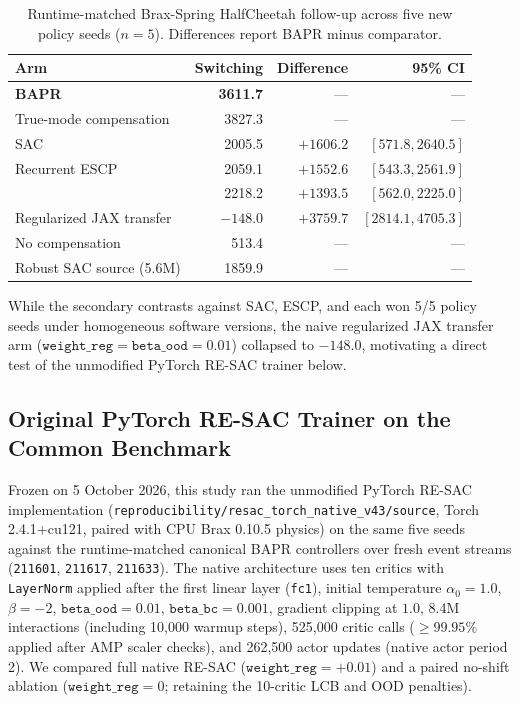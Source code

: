 \begin{table}[ht]
\centering
\caption{Runtime-matched Brax-Spring HalfCheetah follow-up across five new policy seeds ($n=5$). Differences report BAPR minus comparator.}
\label{tab:runtime_comparison}
\small
\begin{tabular}{lrrr}
\toprule
Arm & Switching & Difference & 95\% CI \\
\midrule
\textbf{BAPR} & \textbf{3611.7} & --- & --- \\
True-mode compensation & 3827.3 & --- & --- \\
SAC & 2005.5 & $+1606.2$ & $[571.8,2640.5]$ \\
Recurrent ESCP & 2059.1 & $+1552.6$ & $[543.3,2561.9]$ \\
\resacbaseline{} & 2218.2 & $+1393.5$ & $[562.0,2225.0]$ \\
Regularized JAX transfer & $-148.0$ & $+3759.7$ & $[2814.1,4705.3]$ \\
No compensation & 513.4 & --- & --- \\
Robust SAC source (5.6M) & 1859.9 & --- & --- \\
\bottomrule
\end{tabular}
\end{table}

While the secondary contrasts against SAC, ESCP, and \resacbaseline{} each won 5/5 policy seeds under homogeneous software versions, the naive regularized JAX transfer arm ($\texttt{weight\_reg}=\texttt{beta\_ood}=0.01$) collapsed to $-148.0$, motivating a direct test of the unmodified PyTorch RE-SAC trainer below.

\subsection{Original PyTorch RE-SAC Trainer on the Common Benchmark}
\label{app:source_trainer_comparison}

Frozen on 5 October 2026, this study ran the unmodified PyTorch RE-SAC implementation (\texttt{reproducibility/resac\_torch\_native\_v43/source}, Torch 2.4.1+cu121, paired with CPU Brax 0.10.5 physics) on the same five seeds against the runtime-matched canonical BAPR controllers over fresh event streams (\texttt{211601}, \texttt{211617}, \texttt{211633}). The native architecture uses ten critics with \texttt{LayerNorm} applied after the first linear layer (\texttt{fc1}), initial temperature $\alpha_0=1.0$, $\beta=-2$, $\texttt{beta\_ood}=0.01$, $\texttt{beta\_bc}=0.001$, gradient clipping at $1.0$, 8.4M interactions (including 10,000 warmup steps), 525,000 critic calls ($\ge 99.95\%$ applied after AMP scaler checks), and 262,500 actor updates (native actor period 2). We compared full native RE-SAC ($\texttt{weight\_reg}=+0.01$) and a paired no-shift ablation ($\texttt{weight\_reg}=0$; retaining the 10-critic LCB and OOD penalties).

